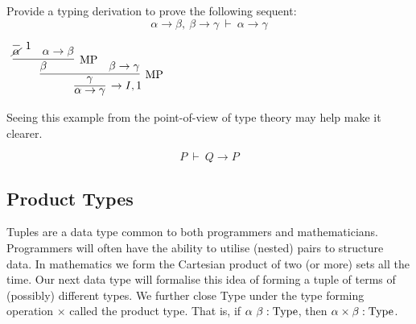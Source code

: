 \documentclass{book}
\begin{document}
        \newpage
        \begin{eg}
    
            Provide a typing derivation to prove the following sequent: $$\alpha \to \beta, \ \beta \to \gamma \ \vdash \ \alpha \to \gamma $$
        
            \begin{center}
                $\begin{array}{c}
                    \infer[\to I,1]{\alpha \to \gamma}
                        {\infer[\MP]{\gamma}
                            {\infer[\MP]{\beta}
                                {\infer[1]{\cancel{\alpha}}{} & \alpha \to \beta}
                            &
                            \beta \to \gamma}}
                \end{array}$
            \end{center}
    
        \end{eg}

        \begin{eg} [I Combinator]
        
        \end{eg}
    
        \begin{eg} [S Combinator]
            
        \end{eg}
    
        \begin{eg} [K Combinator]
            
            Seeing this example from the point-of-view of type theory may help make it clearer. 
    
            $$P \ \vdash \ Q \to P$$
    
        \end{eg}

    \newpage
    \subsection*{Product Types}

        Tuples are a data type common to both programmers and mathematicians. Programmers will often have the ability to utilise (nested) pairs to structure data. In mathematics we form the Cartesian product of two (or more) sets all the time. Our next data type will formalise this idea of forming a tuple of terms of (possibly) different types. We further close Type under the type forming operation $\times$ called the product type. That is, if $\alpha \ \beta : \type$, then $\alpha \times \beta : \text{Type}$.
\end{document}
